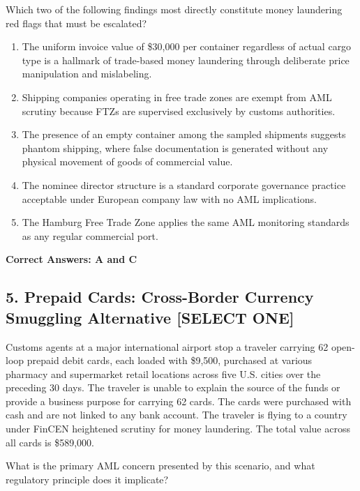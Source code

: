 \documentclass[11pt,a4paper]{article}
\begin{document}
	Which two of the following findings most directly constitute money laundering red flags that must be escalated?
	
	\begin{enumerate}[label=\Alph*.]
		\item The uniform invoice value of \$30,000 per container regardless of actual cargo type is a hallmark of trade-based money laundering through deliberate price manipulation and mislabeling.
		\item Shipping companies operating in free trade zones are exempt from AML scrutiny because FTZs are supervised exclusively by customs authorities.
		\item The presence of an empty container among the sampled shipments suggests phantom shipping, where false documentation is generated without any physical movement of goods of commercial value.
		\item The nominee director structure is a standard corporate governance practice acceptable under European company law with no AML implications.
		\item The Hamburg Free Trade Zone applies the same AML monitoring standards as any regular commercial port.
	\end{enumerate}
	\textbf{Correct Answers: A and C}
	
	\subsection{5. Prepaid Cards: Cross-Border Currency Smuggling Alternative \textnormal{[SELECT ONE]}}
	
	Customs agents at a major international airport stop a traveler carrying 62 open-loop prepaid debit cards, each loaded with \$9,500, purchased at various pharmacy and supermarket retail locations across five U.S. cities over the preceding 30 days. The traveler is unable to explain the source of the funds or provide a business purpose for carrying 62 cards. The cards were purchased with cash and are not linked to any bank account. The traveler is flying to a country under FinCEN heightened scrutiny for money laundering. The total value across all cards is \$589,000.
	
	What is the primary AML concern presented by this scenario, and what regulatory principle does it implicate?
	
\end{document}
